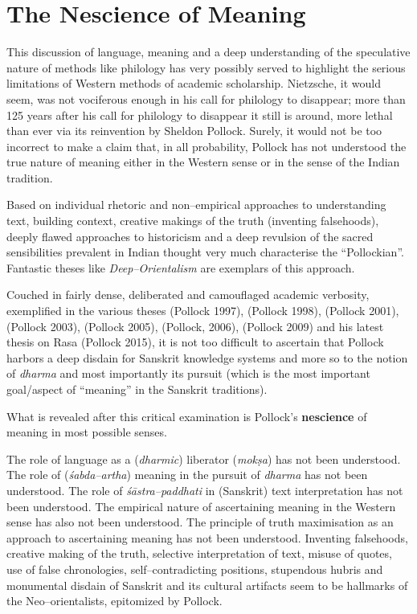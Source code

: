 \vskip -6pt


\section*{The Nescience of Meaning}

\vskip -6pt

This discussion of language, meaning and a deep understanding of the speculative nature of methods like philology has very possibly served to highlight the serious limitations of Western methods of academic scholarship. Nietzsche, it would seem, was not vociferous enough in his call for philology to disappear; more than 125 years after his call for philology to disappear it still is around, more lethal than ever via its reinvention by Sheldon Pollock. Surely, it would not be too incorrect to make a claim that, in all probability, Pollock has not understood the true nature of meaning either in the Western sense or in the sense of the Indian tradition.

Based on individual rhetoric and non–empirical approaches to understanding text, building context, creative makings of the truth (inventing falsehoods), deeply flawed approaches to historicism and a deep revulsion of the sacred sensibilities prevalent in Indian thought very much characterise the “Pollockian”. Fantastic theses like \textit{Deep–Orientalism} are exemplars of this approach.

Couched in fairly dense, deliberated and camouflaged academic verbosity, exemplified in the various theses (Pollock 1997), (Pollock 1998), (Pollock 2001),(Pollock 2003), (Pollock 2005), (Pollock, 2006), (Pollock 2009) and his latest thesis on Rasa (Pollock 2015), it is not too difficult to ascertain that Pollock harbors a deep disdain for Sanskrit knowledge systems and more so to the notion of \textit{dharma} and most importantly its pursuit (which is the most important goal/aspect of “meaning” in the Sanskrit traditions).

What is revealed after this critical examination is Pollock’s \textbf{nescience} of meaning in most possible senses.

The role of language as a (\textit{dharmic}) liberator (\textit{mokṣa}) has not been understood. The role of (\textit{śabda–artha}) meaning in the pursuit of \textit{dharma} has not been understood. The role of \textit{śāstra–paddhati} in (Sanskrit) text interpretation has not been understood. The empirical nature of ascertaining meaning in the Western sense has also not been understood. The principle of truth maximisation as an approach to ascertaining meaning has not been understood. Inventing falsehoods, creative making of the truth, selective interpretation of text, misuse of quotes, use of false chronologies, self–contradicting positions, stupendous hubris and monumental disdain of Sanskrit and its cultural artifacts seem to be hallmarks of the Neo–orientalists, epitomized by Pollock.


